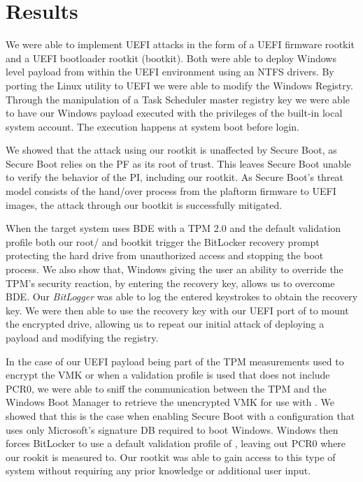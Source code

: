 
\chapter{Results}

We were able to implement \ac{UEFI} attacks in the form of a \ac{UEFI} firmware rootkit and a \ac{UEFI} bootloader rootkit (bootkit).
Both were able to deploy Windows level payload from within the \ac{UEFI} environment using an \ac{NTFS} drivers.
By porting the Linux utility  to \ac{UEFI} we were able to modify the Windows Registry.
Through the manipulation of a Task Scheduler master registry key we were able to have our Windows payload executed with the privileges of the built-in local system account.
The execution happens at system boot before login.

We showed that the attack using our rootkit is unaffected by Secure Boot, as Secure Boot relies on the \ac{PF} as its root of trust.
This leaves Secure Boot unable to verify the behavior of the \ac{PI}, including our rootkit.
As Secure Boot's threat model consists of the hand\-/over process from the plaftorm firmware to \ac{UEFI} images, the attack through our bootkit is successfully mitigated.

When the target system uses \ac{BDE} with a \ac{TPM} 2.0 and the default validation profile \hyperref[tab:pcr-usage]{} both our root\-/ and bootkit trigger the BitLocker recovery prompt protecting the hard drive from unauthorized access and stopping the boot process.
We also show that, Windows giving the user an ability to override the \ac{TPM}'s security reaction, by entering the recovery key, allows us to overcome \ac{BDE}.
Our \emph{BitLogger} was able to log the entered keystrokes to obtain the recovery key.
We were then able to use the recovery key with our \ac{UEFI} port of  to mount the encrypted drive, allowing us to repeat our initial attack of deploying a payload and modifying the registry.

In the case of our \ac{UEFI} payload being part of the \ac{TPM} measurements used to encrypt the \ac{VMK} or when a validation profile is used that does not include \ac{PCR}0, we were able to sniff the communication between the \ac{TPM} and the Windows Boot Manager to retrieve the unencrypted \ac{VMK} for use with .
We showed that this is the case when enabling Secure Boot with a configuration that uses only Microsoft's signature \ac{DB} required to boot Windows.
Windows then forces BitLocker to use a default validation profile of \hyperref[tab:pcr-usage]{}, leaving out \ac{PCR}0 where our rookit is measured to.
Our rootkit was able to gain access to this type of system without requiring any prior knowledge or additional user input.